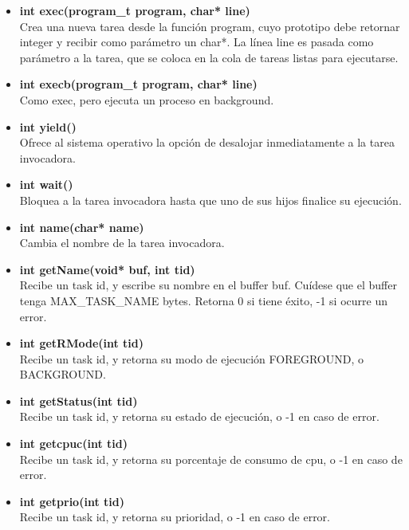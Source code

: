 \documentclass[a4paper,10pt]{article}
\begin{document}
\begin{itemize}
 \item \textbf{int exec(program\_t program, char* line)}\\
    \noindent
    Crea una nueva tarea desde la función program, cuyo prototipo debe retornar integer y recibir como parámetro un char*.
    La línea line es pasada como parámetro a la tarea, que se coloca en la cola de tareas listas para ejecutarse.

 \item \textbf{int execb(program\_t program, char* line)}\\
    \noindent Como exec, pero ejecuta un proceso en background.

 \item \textbf{int yield()}\\
    \noindent Ofrece al sistema operativo la opción de desalojar inmediatamente a la tarea invocadora.

 \item \textbf{int wait()}\\
    \noindent Bloquea a la tarea invocadora hasta que uno de sus hijos finalice su ejecución.

 \item \textbf{int name(char* name)}\\
    \noindent Cambia el nombre de la tarea invocadora.

 \item \textbf{int getName(void* buf, int tid)}\\
    \noindent Recibe un task id, y escribe su nombre en el buffer buf. Cuídese que el buffer tenga MAX\_TASK\_NAME bytes. Retorna 0 si tiene éxito, -1 si ocurre un error.

\item \textbf{int getRMode(int tid)}\\
    \noindent Recibe un task id, y retorna su modo de ejecución FOREGROUND, o BACKGROUND.

 \item \textbf{int getStatus(int tid)}\\
    \noindent Recibe un task id, y retorna su estado de ejecución, o -1 en caso de error.

 \item \textbf{int getcpuc(int tid)}\\
    \noindent Recibe un task id, y retorna su porcentaje de consumo de cpu, o -1 en caso de error.

 \item \textbf{int getprio(int tid)}\\
    \noindent Recibe un task id, y retorna su prioridad, o -1 en caso de error.


\end{itemize}
\end{document}
